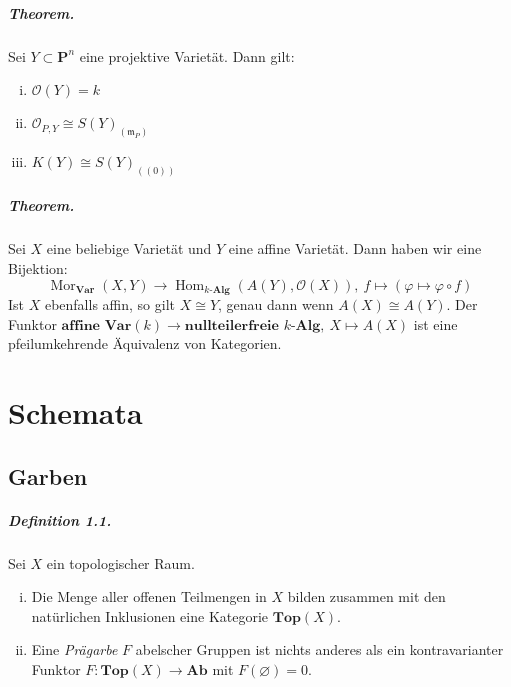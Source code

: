 \documentclass[11pt,b5paper,openany]{memoir}
\begin{document}
\paragraph{Theorem.} Sei $Y\subset\mathbf{P}^n$ eine projektive Varietät. Dann gilt:
\begin{enumerate}[(i)]
\item $\mathcal{O}(Y)=k$
\item $\mathcal{O}_{P,Y}\cong S(Y)_{(\mathfrak{m}_P)}$
\item $K(Y)\cong S(Y)_{((0))}$
\end{enumerate}

\paragraph{Theorem.} Sei $X$ eine beliebige Varietät und $Y$ eine affine Varietät. Dann haben wir eine Bijektion:
\[\operatorname{Mor}_{\textbf{Var}}(X,Y) \to \operatorname{Hom}_{\textbf{$k$-Alg}}(A(Y),\mathcal{O}(X)),\ f\mapsto(\varphi\mapsto \varphi\circ f) \]
Ist $X$ ebenfalls affin, so gilt $X\cong Y$, genau dann wenn $A(X)\cong A(Y)$. Der Funktor $\textbf{affine Var$(k)$}\to\textbf{nullteilerfreie $k$-Alg},\ X\mapsto A(X)$ ist eine pfeilumkehrende Äquivalenz von Kategorien.

\chapter{Schemata}
\section{Garben}

\paragraph{Definition 1.1.}\label{1.1} Sei $X$ ein topologischer Raum.
\begin{enumerate}[(i)]
\item Die Menge aller offenen Teilmengen in $X$ bilden zusammen mit den natürlichen Inklusionen eine Kategorie $\textbf{Top$(X)$}$.
\item Eine \textit{Prägarbe} $F$ abelscher Gruppen ist nichts anderes als ein kontravarianter Funk\-tor $F:\textbf{Top$(X)$}\to\textbf{Ab}$ mit $F(\varnothing)=0$.
\end{enumerate}
\end{document}
